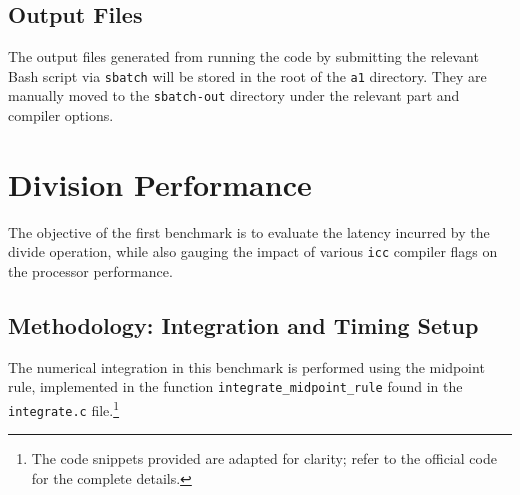 \documentclass{article}
\begin{document}
\subsection{Output Files}
The output files generated from running the code by submitting the relevant Bash script via \texttt{sbatch} will be stored in the root of the \texttt{a1} directory. They are manually moved 
to the \texttt{sbatch-out} directory under the relevant part and compiler options.

\section{Division Performance}
The objective of the first benchmark is to evaluate the latency incurred by the divide operation, while also gauging the impact of various \texttt{icc} compiler flags on the processor performance. 

\subsection*{Methodology: Integration and Timing Setup}
The numerical integration in this benchmark is performed using the midpoint rule, implemented in the function \texttt{integrate\_midpoint\_rule} found in the \texttt{integrate.c} file.\footnote{The code snippets provided are adapted for clarity; refer to the official code for the complete details.}
\end{document}
